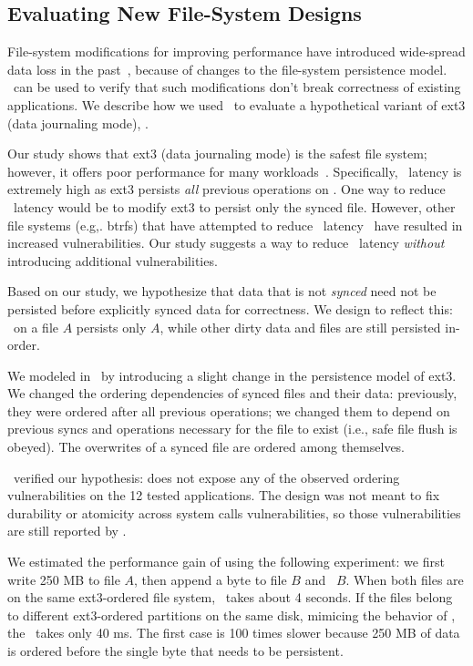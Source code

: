 \subsection{Evaluating New File-System Designs} 
\label{sec-twojournal}

File-system modifications for improving performance have introduced wide-spread
data loss in the past~\cite{URLmassivefsthread}, because of changes to the
file-system persistence model. \toolname\ can be used to verify that such
modifications don't break correctness of existing applications. We describe how
we used \toolname\ to evaluate a hypothetical variant of ext3 (data journaling
mode), .

Our study shows that ext3 (data journaling mode) is the safest file system;
however, it offers poor performance for many
workloads~\cite{PrabhakaranEtAl05-Usenix}. Specifically, \fsyncSC\
latency is extremely high as ext3 persists \textit{all} previous operations on
\fsyncSC. One way to reduce \fsyncSC\ latency would be to modify ext3 to
persist only the synced file. However, other file systems (e.g,. btrfs) that
have attempted to reduce \fsyncSC\ latency~\cite{LWN1} have resulted in increased
vulnerabilities. Our study suggests a way to reduce \fsyncSC\ latency
\textit{without} introducing additional vulnerabilities. 

Based on our study, we hypothesize that data that is not \textit{synced} need
not be persisted before explicitly synced data for correctness. We design
\smalltt{ext3-fastfsync} to reflect this: \fsyncSC\ on a file $A$ persists only
$A$, while other dirty data and files are still persisted in-order.

We modeled  in \toolname\ by introducing a slight
change in the persistence model of ext3. We changed the ordering dependencies
of synced files and their data: previously, they were ordered after all
previous operations; we changed them to depend on previous syncs and operations
necessary for the file to exist (i.e., safe file flush is obeyed).  The
overwrites of a synced file are ordered among themselves.

\toolname\ verified our hypothesis:  does not expose
any of the observed ordering vulnerabilities on the 12 tested applications.
The design was not meant to fix durability or atomicity across system calls
vulnerabilities, so those vulnerabilities are still reported by \toolname. 

We estimated the performance gain of  using the
following experiment: we first write 250 MB to file $A$, then append a byte to
file $B$ and \fsyncSC\ $B$. When both files are on the same ext3-ordered file
system, \fsyncSC\ takes about 4 seconds.  If the files belong to different
ext3-ordered partitions on the same disk, mimicing the behavior of
\smalltt{ext3-fastfsync}, the \fsyncSC\ takes only 40 ms. The first case is 100
times slower because 250 MB of data is ordered before the single byte that
needs to be persistent.

